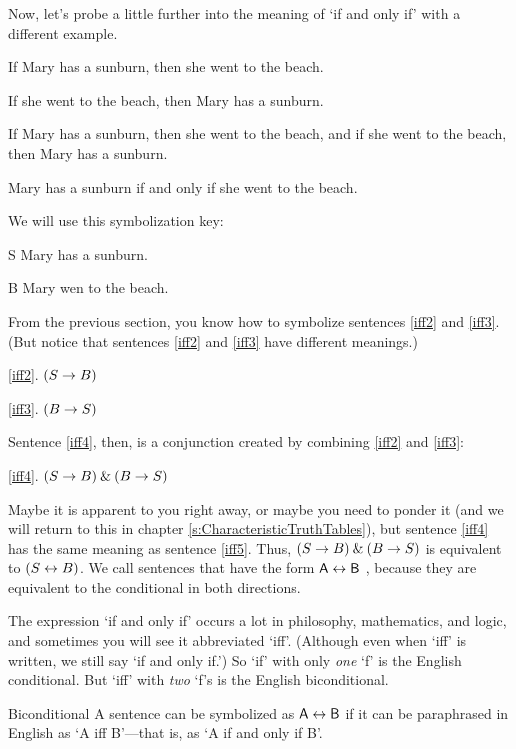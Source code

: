 Now, let's probe a little further into the meaning of `if and only if' with a different example.
	\begin{earg}
		\item[\ex{iff2}] If Mary has a sunburn, then she went to the beach.
		\item[\ex{iff3}] If she went to the beach, then Mary has a sunburn. 
		\item[\ex{iff4}] If Mary has a sunburn, then she went to the beach, and if she went to the beach, then Mary has a sunburn.
		\item[\ex{iff5}] Mary has a sunburn if and only if she went to the beach.
	\end{earg}
We will use this symbolization key:
	\begin{ekey}
		\item[S] Mary has a sunburn.
		\item[B] Mary wen to the beach.
	\end{ekey}
From the previous section, you know how to symbolize sentences \ref{iff2} and \ref{iff3}. (But notice that sentences \ref{iff2} and \ref{iff3} have different meanings.)
	\begin{earg}
		\item[\ref{iff2}.] $(S \rightarrow B)$
		\item[\ref{iff3}.] $(B \rightarrow S)$ 
	\end{earg}
Sentence \ref{iff4}, then, is a conjunction created by combining \ref{iff2} and \ref{iff3}: 
	\begin{earg}
		\item[\ref{iff4}.] $(S \rightarrow B) \mathbin{\&} (B \rightarrow S)$
 	\end{earg}
Maybe it is apparent to you right away, or maybe you need to ponder it (and we will return to this in chapter \ref{s:CharacteristicTruthTables}), but sentence \ref{iff4} has the same meaning as sentence \ref{iff5}. Thus, $(S \rightarrow B) \mathbin{\&} (B \rightarrow S)$ is equivalent to $(S \leftrightarrow B)$. We call sentences that have the form $\mathsf{A} \leftrightarrow \mathsf{B}$ , because they are equivalent to the conditional in both directions.

The expression `if and only if' occurs a lot in philosophy, mathematics, and logic, and sometimes you will see it abbreviated `iff'. (Although even when `iff' is written, we still say `if and only if.') So `if' with only \emph{one} `f' is the English conditional. But `iff' with \emph{two} `f's is the English biconditional.

\begin{factboxy}{Biconditional}
		A sentence can be symbolized as $\mathsf{A} \leftrightarrow \mathsf{B}$ if it can be paraphrased in English as `A iff B'---that is, as `A if and only if B'.
\end{factboxy}
	
